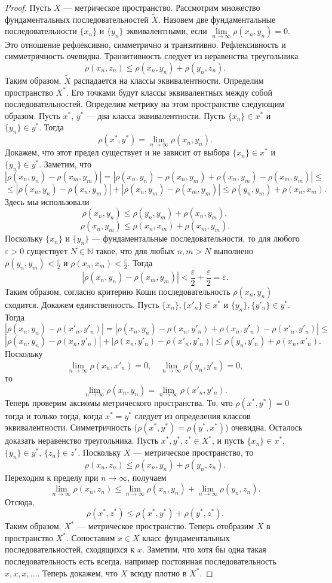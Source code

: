 \documentclass[12pt, titlepage, oneside]{amsbook}
\newcommand{\NN}{\mathbb{N}}
\theoremstyle{definition}
\theoremstyle{remark}
\begin{document}
\begin{proof}
Пусть $X$ --- метрическое пространство. Рассмотрим множество фундаментальных последовательностей $\tilde{X}$. Назовем две фундаментальные последовательности $\{x_n\}$ и $\{y_n\}$ эквивалентными, если $\lim\limits_{n\rightarrow\infty}\rho(x_n,y_n)=0$. Это отношение рефлексивно, симметрично и транзитивно. Рефлексивность и симметричность очевидна. Транзитивность следует из неравенства треугольника $$\rho(x_n,z_n)\leq \rho(x_n,y_n)+\rho(y_n,z_n).$$ Таким образом, $\tilde{X}$ распадается на классы эквивалентности. Определим пространство $X^*$. Его точками будут классы эквивалентных между собой последовательностей. Определим метрику на этом пространстве следующим образом. Пусть $x^*$, $y^*$ --- два класса эквивалентности. Пусть $\{x_n\}\in x^*$ и $\{y_n\}\in y^*$. Тогда $$\rho(x^*,y^*)=\lim\limits_{n\rightarrow\infty}\rho(x_n,y_n).$$ Докажем, что этот предел существует и не зависит от выбора $\{x_n\}\in x^*$ и $\{y_n\}\in y^*$. Заметим, что $$|\rho(x_n,y_n)-\rho(x_m,y_m)|=|\rho(x_n,y_n)-\rho(x_n,y_m)+\rho(x_n,y_m)-\rho(x_m,y_m)|\leq$$ $$\leq|\rho(x_n,y_n)-\rho(x_n,y_m)|+|\rho(x_n,y_m)-\rho(x_m,y_m)|\leq\rho(y_n,y_m)+\rho(x_n,x_m).$$ Здесь мы использовали $$\rho(x_n,y_n)\leq\rho(y_n,y_m)+\rho(x_n,y_m),$$ $$\rho(x_n,y_m)\leq\rho(x_n,x_m)+\rho(x_m,y_m).$$ Поскольку $\{x_n\}$ и $\{y_n\}$ --- фундаментальные последовательности, то для любого $\varepsilon>0$ существует $N\in\NN$ такое, что для любых $n,m>N$ выполнено $\rho(y_n,y_m)<\frac{\varepsilon}{2}$ и $\rho(x_n,x_m)<\frac{\varepsilon}{2}$. Тогда $$|\rho(x_n,y_n)-\rho(x_m,y_m)|<\frac{\varepsilon}{2}+\frac{\varepsilon}{2}=\varepsilon.$$ Таким образом, согласно критерию Коши последовательность $\rho(x_n,y_n)$ сходится. Докажем единственность. Пусть $\{x_n\},\{x'_n\}\in x^*$ и $\{y_n\},\{y'_n\}\in y^*$. Тогда $$|\rho(x_n,y_n)-\rho(x'_n,y'_n)|=|\rho(x_n,y_n)-\rho(x_n,y'_n)+\rho(x_n,y'_n)-\rho(x'_n,y'_n)|\leq$$ $$|\rho(x_n,y_n)-\rho(x_n,y'_n)|+|\rho(x_n,y'_n)-\rho(x'_n,y'_n)|\leq\rho(y_n,y'_n)+\rho(x_n,x'_n).$$ Поскольку $$\lim\limits_{n\rightarrow\infty}\rho(x_n,x'_n)=0,\quad\lim\limits_{n\rightarrow\infty}\rho(y_n,y'_n)=0,$$ то $$\lim\limits_{n\rightarrow\infty}\rho(x_n,y_n)=\lim\limits_{n\rightarrow\infty}\rho(x'_n,y'_n).$$ Теперь проверим аксиомы метрического пространства. То, что $\rho(x^*,y^*)=0$ тогда и только тогда, когда $x^*=y^*$ следует из определения классов эквивалентности. Симметричность ($\rho(x^*,y^*)=\rho(y^*,x^*)$) очевидна. Осталось доказать неравенство треугольника. Пусть $x^*,y^*,z^*\in X^*$, и пусть $\{x_n\}\in x^*$, $\{y_n\}\in y^*$, $\{z_n\}\in z^*$. Поскольку $X$ --- метрическое пространство, то $$\rho(x_n,z_n)\leq\rho(x_n,y_n)+\rho(y_n,z_n).$$ Переходим к пределу при $n\rightarrow\infty$, получаем $$\lim\limits_{n\rightarrow\infty}\rho(x_n,z_n)\leq\lim\limits_{n\rightarrow\infty}\rho(x_n,y_n)+\lim\limits_{n\rightarrow\infty}\rho(y_n,z_n).$$ Отсюда, $$\rho(x^*,z^*)\leq\rho(x^*,y^*)+\rho(y^*,z^*).$$ Таким образом, $X^*$ --- метрическое пространство. Теперь отобразим $X$ в пространство $X^*$. Сопоставим $x\in X$ класс фундаментальных последовательностей, сходящихся к $x$. Заметим, что хотя бы одна такая последовательность есть всегда, например постоянная последовательность $x,x,x,\ldots$. Теперь докажем, что $X$ всюду плотно в $X^*$. 
\end{proof}
\end{document}
